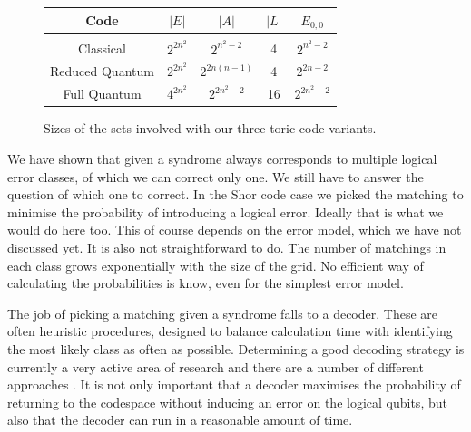 \begin{figure}\label{code_sizes}
  \begin{center}
    \begin{tabular}{c c c c c}
      Code & $|E|$ & $|A|$ & $|L|$ & $E_{0,0}$ \\[1.5ex]
      \hline \\[0ex]
      Classical         & $2^{2n^2}$ & $2^{n^2-2}$ &  4 & $2^{n^2-2}$ \\[3ex]
      Reduced Quantum   & $2^{2n^2}$ & $2^{2n(n-1)}$ &  4 & $2^{2n-2}$ \\[3ex] 
      Full Quantum      & $4^{2n^2}$ & $2^{2n^2-2}$ & 16 & $2^{2n^2-2}$
    \end{tabular}
  \end{center}
  \caption{Sizes of the sets involved with our three toric code variants.}
\end{figure}

We have shown that given a syndrome always corresponds to multiple logical error classes, of which we can correct only one. We still have to answer the question of which one to correct. In the Shor code case we picked the matching to minimise the probability of introducing a logical error. Ideally that is what we would do here too. This of course depends on the error model, which we have not discussed yet. It is also not straightforward to do. The number of matchings in each class grows exponentially with the size of the grid. No efficient way of calculating the probabilities is know, even for the simplest error model.

The job of picking a matching given a syndrome falls to a decoder. These are often heuristic procedures, designed to balance calculation time with identifying the most likely class as often as possible. Determining a good decoding strategy is currently a very active area of research and there are a number of different approaches \cite{poulin_renormalisation, fowler_classical_processing, wooton_mcmc1}. It is not only important that a decoder maximises the probability of returning to the codespace without inducing an error on the logical qubits, but also that the decoder can run in a reasonable amount of time. 




